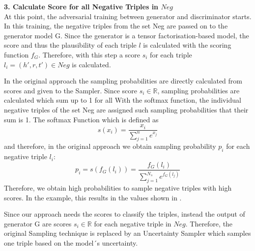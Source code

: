 \textbf{3. Calculate Score for all Negative Triples in $Neg$}\\

At this point, the adversarial training between generator and discriminator starts.
In this training, the negative triples from the set Neg are passed on to the generator model G.
Since the generator is a tensor factorisation-based model, the score and thus the plausibility of each triple $l$ is calculated with the scoring function $f_G$.
Therefore, with this step a score $s_i$ for each triple $l_i = (h',r,t') \in Neg$ is calculated.

In the original \kbgan approach the sampling probabilities are directly calculated from scores and given to the Sampler.
Since score $s_i \in \mathbb{R}$, sampling probabilities are calculated which sum up to 1 for all 
With the softmax function, the individual negative triples of the set Neg are assigned such sampling probabilities that their sum is 1.
The softmax Function which is defined as 
\begin{equation}
    s(x_i) = \frac{x_i}{\sum_{j=1}^{n}{e^{x_j}}}
\end{equation}
and therefore, in the  original approach we obtain sampling probability $p_i$ for each negative triple $l_i$:
\begin{equation}
    p_i = s(f_G(l_i)) = \frac{f_G(l_i)}{\sum_{j=1}^{N_s}{e^{f_G(l_j)}}}
\end{equation}
Therefore, we obtain high probabilities to sample negative triples with high scores.
In the example, this results in the values shown in .


Since our approach needs the scores to classify the triples, instead the output of generator G are scores $s_i \in \mathbb{R}$ for each negative triple in $Neg$.
Therefore, the original Sampling technique is replaced by an Uncertainty Sampler which samples one triple based on the model´s uncertainty.


